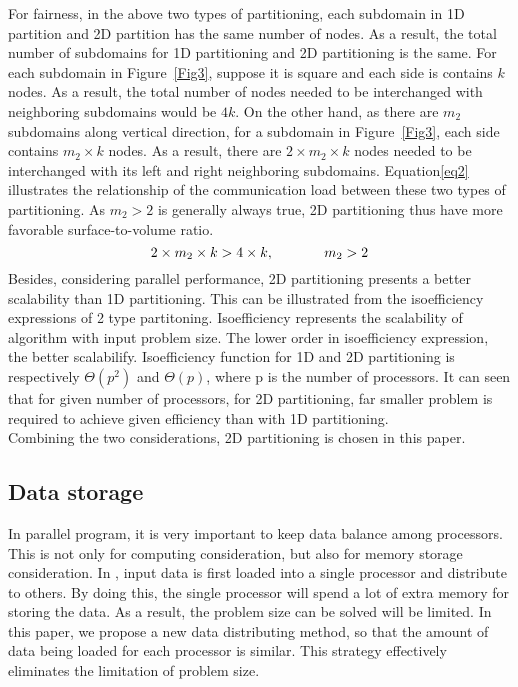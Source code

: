 \documentclass{sig-alternate}
\begin{document}
	For fairness, in the above two types of partitioning, each subdomain in 1D partition and 2D partition has the same number
	of nodes. As a result, the total number of subdomains for 1D partitioning and 2D partitioning is the same. For each subdomain 
	in Figure~\ref{Fig3}, suppose it is square and each side is contains $k$ nodes. As a result, the total 
	number of nodes needed to be interchanged with neighboring subdomains would be $4k$. On the other hand, as 
	there are $m_2$ subdomains along vertical direction, for a subdomain in Figure~\ref{Fig3}, each side contains
	$m_2\times k$ nodes. As a result, there are $2\times m_2\times k$ nodes needed to be interchanged with its left and right 
	neighboring subdomains. Equation\eqref{eq2} illustrates the relationship of the communication load between these two types of
	partitioning. As $m_2>2$ is generally always true, 2D partitioning thus have more favorable surface-to-volume ratio.    
	\begin{equation}
		2\times m_2\times k > 4\times k, \hspace{0.5 in} m_2 > 2 \label{eq2}
	\end{equation}
	Besides, considering parallel performance, 2D partitioning presents a better scalability than 1D partitioning. This can be
	illustrated from the isoefficiency expressions of 2 type partitoning. Isoefficiency represents the scalability of algorithm
	with input problem size. The lower order in isoefficiency expression, the better scalabilify. Isoefficiency function for 1D 
	and 2D partitioning is respectively $\Theta(p^2)$ and $\Theta(p)$\cite{Grama}\cite{Kumar}, where p is the number of processors. 
	It can seen that for given number of processors, for 2D partitioning, far smaller problem is required to achieve given 
	efficiency than with 1D partitioning.\\

	Combining the two considerations, 2D partitioning is chosen in this paper.\\	
	  
  \subsection{Data storage}
	In parallel program, it is very important to keep data balance among processors. This is not only for computing
	consideration, but also for memory storage consideration. In \cite{Quming}, input data is first loaded into a single processor 
	and distribute to others. By doing this, the single processor will spend a lot of extra memory for storing the data. As a result,
	the problem size can be solved will be limited. In this paper, we propose a new data distributing method, so that the amount of
	data being loaded for each processor is similar. This strategy effectively eliminates the limitation of problem size.\\
\end{document}
